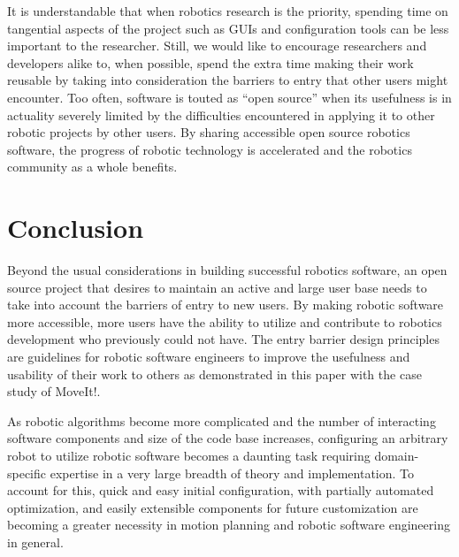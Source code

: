 \documentclass[10pt,journal,compsoc]{joser1}
\begin{document}
{It is understandable that when robotics research is the priority, spending time on tangential aspects of the project such as GUIs and configuration tools can be less important to the researcher. Still, we would like to encourage researchers and developers alike to, when possible, spend the extra time making their work reusable by taking into consideration the barriers to entry that other users might encounter. Too often, software is touted as ``open source'' when its usefulness is in actuality severely limited by the difficulties encountered in applying it to other robotic projects by other users. By sharing accessible open source robotics software, the progress of robotic technology is accelerated and the robotics community as a whole benefits.

\section{Conclusion}
\label{sec::conclusion}

Beyond the usual considerations in building successful robotics software, an open source project that desires to maintain an active and large user base needs to take into account the barriers of entry to new users. By making robotic software more accessible, more users have the ability to utilize and contribute to robotics development who previously could not have. The entry barrier design principles are guidelines for robotic software engineers to improve the usefulness and usability of their work to others as demonstrated in this paper with the case study of MoveIt!.

As robotic algorithms become more complicated and the number of interacting software components and size of the code base increases, configuring an arbitrary robot to utilize robotic software becomes a daunting task requiring domain-specific expertise in a very large breadth of theory and implementation. To account for this, quick and easy initial configuration, with partially automated optimization, and easily extensible components for future customization are becoming a greater necessity in motion planning and robotic software engineering in general. 

}
\end{document}
